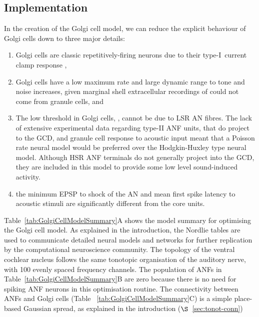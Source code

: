 \subsection{Implementation}\label{sec:Golgi:implementation}

In the creation of the Golgi cell model, we can reduce the explicit
behaviour of Golgi cells down to three major details:
 \begin{enumerate}
 \item Golgi cells are classic repetitively-firing neurons due to
   their type-I~current clamp response
   \citep{FerragamoGoldingEtAl:1998},
 \item Golgi cells have a low maximum rate and large dynamic range to
   tone and noise increases, given marginal shell extracellular
   recordings of \citet{GhoshalKim:1997} could not come from granule
   cells, and
 \item The low threshold in Golgi cells, \citet{GhoshalKim:1997},
   cannot be due to LSR AN fibres. The lack of extensive experimental
   data regarding type-II ANF units, that do project to the GCD, and
   granule cell response to acoustic input meant that a Poisson rate
   neural model would be preferred over the Hodgkin-Huxley type neural
   model.  Although HSR ANF terminals do not generally project into
   the GCD, they are included in this model to provide some low level
   sound-induced activity.
 \item the minimum EPSP to shock of the AN
   \citep{FerragamoGoldingEtAl:1998} and mean first spike latency to
   acoustic stimuli \citep{GhoshalKim:1997} are significantly
   different from the core \VCN units.
 \end{enumerate}

\smallskip{}

Table~\ref{tab:GolgiCellModelSummary}A shows the model summary for
optimising the Golgi cell model. As explained in the introduction, the
Nordlie tables are used to communicate detailed neural models and
networks for further replication by the computational neuroscience
community. The topology of the ventral cochlear nucleus follows the
same tonotopic organisation of the auditory nerve, with 100 evenly
spaced frequency channels. The population of ANFs in
Table~\ref{tab:GolgiCellModelSummary}B are zero because there is no
need for spiking ANF neurons in this optimisation routine.  The
connectivity between ANFs and Golgi cells (Table
~\ref{tab:GolgiCellModelSummary}C) is a simple place-based Gaussian
spread, as explained in the introduction ($\S$~\ref{sec:tonot-conn})

